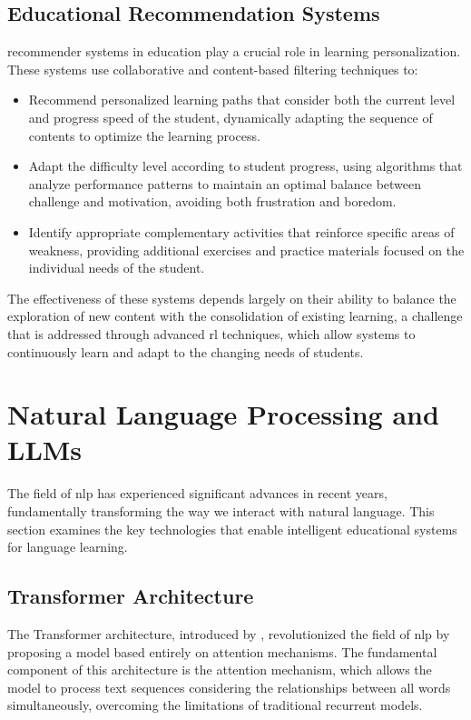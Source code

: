 \subsection{Educational Recommendation Systems}
\gls{recommender} systems in education play a crucial role in learning personalization. These systems use collaborative and content-based filtering techniques to:

\begin{itemize}
  \item Recommend personalized learning paths that consider both the current level and progress speed of the student, dynamically adapting the sequence of contents to optimize the learning process.

  \item Adapt the difficulty level according to student progress, using algorithms that analyze performance patterns to maintain an optimal balance between challenge and motivation, avoiding both frustration and boredom.

  \item Identify appropriate complementary activities that reinforce specific areas of weakness, providing additional exercises and practice materials focused on the individual needs of the student.
\end{itemize}

The effectiveness of these systems depends largely on their ability to balance the exploration of new content with the consolidation of existing learning, a challenge that is addressed through advanced \gls{rl} techniques, which allow systems to continuously learn and adapt to the changing needs of students.

\section{Natural Language Processing and LLMs}

The field of \gls{nlp} has experienced significant advances in recent years, fundamentally transforming the way we interact with natural language. This section examines the key technologies that enable intelligent educational systems for language learning.

\subsection{Transformer Architecture}

The Transformer architecture, introduced by \cite{vaswani2017attention}, revolutionized the field of \gls{nlp} by proposing a model based entirely on attention mechanisms. The fundamental component of this architecture is the \gls{attention} mechanism, which allows the model to process text sequences considering the relationships between all words simultaneously, overcoming the limitations of traditional recurrent models.

